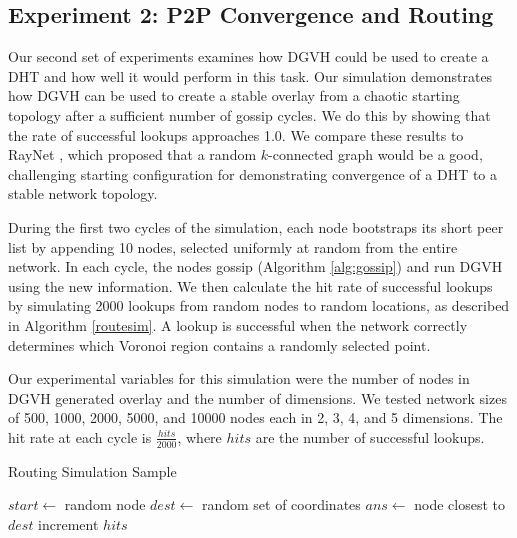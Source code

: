 \documentclass[11pt, conference, letterpaper]{IEEEtran}
\begin{document}
\subsection{Experiment 2: P2P Convergence and Routing}
Our second set of experiments examines how DGVH could be used to create a DHT and how well it would perform in this task.
Our simulation demonstrates how DGVH  can be used to create a stable overlay from a chaotic starting topology after a sufficient number of gossip cycles.  
We do this by showing that the rate of successful lookups approaches 1.0.
We compare these results to RayNet \cite{raynet}, which proposed that a random $k$-connected graph would be a good, challenging starting configuration for demonstrating convergence of a DHT to a stable network topology.

During the first two cycles of the simulation, each node bootstraps its short peer list by appending 10 nodes, selected uniformly at random from the entire network.
In each cycle, the nodes gossip (Algorithm \ref{alg:gossip}) and run DGVH using the new information.
We then calculate the hit rate of successful lookups by simulating 2000 lookups from random nodes to random locations, as described in Algorithm \ref{routesim}.
A lookup is successful when the network correctly determines which Voronoi region contains a randomly selected point.


Our experimental variables for this simulation were the number of nodes in DGVH generated overlay and the number of dimensions.  
We tested network sizes of 500, 1000, 2000, 5000, and 10000 nodes each in 2, 3, 4, and 5 dimensions.
The hit rate at each cycle is $\frac{hits}{2000}$, where $hits$ are the number of successful lookups.




\begin{algorithm}
	\caption{Routing Simulation Sample}
	\label{routesim}
	\begin{algorithmic}[1]  %
		\STATE $start \leftarrow$ random node
		\STATE $dest \leftarrow$ random set of coordinates
		\STATE $ans \leftarrow$ node closest to $dest$
		\STATE increment $hits$
		\ENDIF
	\end{algorithmic} 
\end{algorithm}


\end{document}
